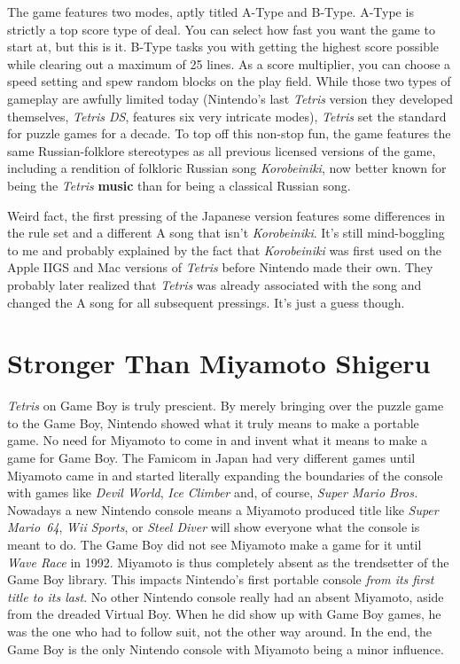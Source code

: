 \documentclass{book}
\begin{document}
The game features two modes, aptly titled A-Type and B-Type. A-Type is strictly a top score type of deal. You can select how fast you want the game to start at, but this is it. B-Type tasks you with getting the highest score possible while clearing out a maximum of 25 lines. As a score multiplier, you can choose a speed setting and spew random blocks on the play field. While those two types of gameplay are awfully limited today (Nintendo’s last \emph{Tetris} version they developed themselves, \emph{Tetris DS}, features six very intricate modes), \emph{Tetris} set the standard for puzzle games for a decade. To top off this non-stop fun, the game features the same Russian-folklore stereotypes as all previous licensed versions of the game, including a rendition of folkloric Russian song \emph{Korobeiniki}, now better known for being the \emph{Tetris} \textbf{music} than for being a classical Russian song.

Weird fact, the first pressing of the Japanese version features some differences in the rule set and a different A song that isn’t \emph{Korobeiniki}. It’s still mind-boggling to me and probably explained by the fact that \emph{Korobeiniki} was first used on the Apple IIGS and Mac versions of \emph{Tetris} before Nintendo made their own. They probably later realized that \emph{Tetris} was already associated with the song and changed the A song for all subsequent pressings. It’s just a guess though.

\FloatBarrier\needspace{5pt}\section*{Stronger Than Miyamoto Shigeru}\nopagebreak[4]

\emph{Tetris} on Game Boy is truly prescient. By merely bringing over the puzzle game to the Game Boy, Nintendo showed what it truly means to make a portable game. No need for Miyamoto to come in and invent what it means to make a game for Game Boy. The Famicom in Japan had very different games until Miyamoto came in and started literally expanding the boundaries of the console with games like \emph{Devil World}, \emph{Ice Climber} and, of course, \emph{Super Mario Bros.} Nowadays a new Nintendo console means a Miyamoto produced title like \emph{Super Mario 64}, \emph{Wii Sports}, or \emph{Steel Diver} will show everyone what the console is meant to do. The Game Boy did not see Miyamoto make a game for it until \emph{Wave Race} in 1992. Miyamoto is thus completely absent as the trendsetter of the Game Boy library. This impacts Nintendo’s first portable console \emph{from its first title to its last}. No other Nintendo console really had an absent Miyamoto, aside from the dreaded Virtual Boy. When he did show up with Game Boy games, he was the one who had to follow suit, not the other way around. In the end, the Game Boy is the only Nintendo console with Miyamoto being a minor influence.
\end{document}
